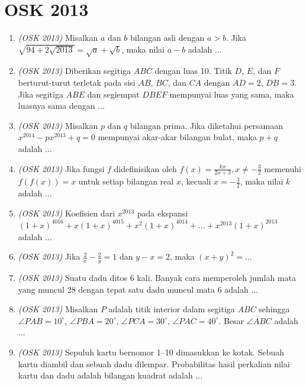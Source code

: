 \section{OSK 2013}
\begin{enumerate}
	\item \textit{(OSK 2013)} Misalkan $a$ dan $b$ bilangan asli dengan $a > b$. Jika $\sqrt{94 + 2\sqrt{2013}} = \sqrt{a} + \sqrt{b}$, maka nilai $a - b$ adalah $\dots$
	
	\item \textit{(OSK 2013)} Diberikan segitiga $ABC$ dengan luas 10. Titik $D$, $E$, dan $F$ berturut-turut terletak pada sisi $AB$, $BC$, dan $CA$ dengan $AD=2$, $DB=3$. Jika segitiga $ABE$ dan segiempat $DBEF$ mempunyai luas yang sama, maka luasnya sama dengan $\dots$
	
	\item \textit{(OSK 2013)} Misalkan $p$ dan $q$ bilangan prima. Jika diketahui persamaan $x^{2014} - px^{2013} + q = 0$ mempunyai akar-akar bilangan bulat, maka $p + q$ adalah $\dots$
	
	\item \textit{(OSK 2013)} Jika fungsi $f$ didefinisikan oleh $f(x) = \frac{kx}{2x+3}, x \ne -\frac{3}{2}$ memenuhi $f(f(x)) = x$ untuk setiap bilangan real $x$, kecuali $x = -\frac32$, maka nilai $k$ adalah $\dots$
	
	\item \textit{(OSK 2013)} Koefisien dari $x^{2013}$ pada ekspansi $(1+x)^{4016} + x(1+x)^{4015} + x^2(1+x)^{4014} + \dots + x^{2013}(1+x)^{2013}$ adalah $\dots$
	
	\item \textit{(OSK 2013)} Jika $\frac{2}{x} - \frac{2}{y} = 1$ dan $y - x = 2$, maka $(x+y)^2 = \dots$
	
	\item \textit{(OSK 2013)} Suatu dadu ditos 6 kali. Banyak cara memperoleh jumlah mata yang muncul 28 dengan tepat satu dadu muncul mata 6 adalah $\dots$
	
	\item \textit{(OSK 2013)} Misalkan $P$ adalah titik interior dalam segitiga $ABC$ sehingga $\angle PAB=10^\circ$, $\angle PBA=20^\circ$, $\angle PCA=30^\circ$, $\angle PAC=40^\circ$. Besar $\angle ABC$ adalah $\dots$
	
	\item \textit{(OSK 2013)} Sepuluh kartu bernomor 1–10 dimasukkan ke kotak. Sebuah kartu diambil dan sebuah dadu dilempar. Probabilitas hasil perkalian nilai kartu dan dadu adalah bilangan kuadrat adalah $\dots$
	

\end{enumerate}
